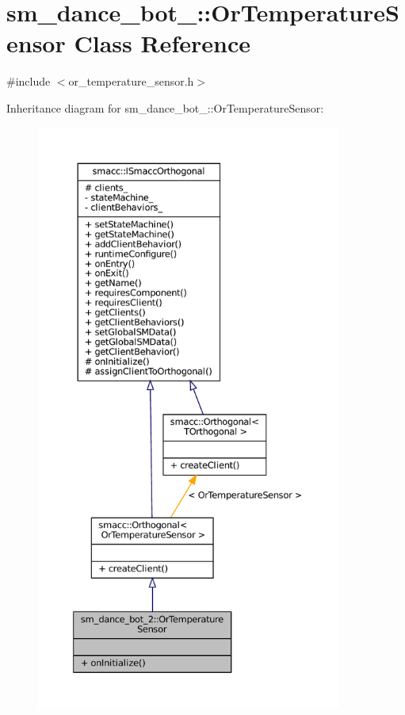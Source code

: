 \hypertarget{classsm__dance__bot__2_1_1OrTemperatureSensor}{}\section{sm\+\_\+dance\+\_\+bot\+\_\+:\+:Or\+Temperature\+Sensor Class Reference}
\label{classsm__dance__bot__2_1_1OrTemperatureSensor}


{\ttfamily \#include $<$or\+\_\+temperature\+\_\+sensor.\+h$>$}



Inheritance diagram for sm\+\_\+dance\+\_\+bot\+\_\+:\+:Or\+Temperature\+Sensor\+:
\nopagebreak
\begin{figure}[H]
\begin{center}
\leavevmode
\includegraphics[height=550pt]{classsm__dance__bot__2_1_1OrTemperatureSensor__inherit__graph}
\end{center}
\end{figure}


